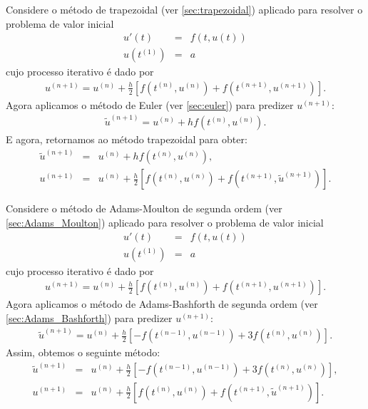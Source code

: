 \begin{ex} Considere o método de trapezoidal (ver \ref{sec:trapezoidal}) aplicado para resolver o problema de valor inicial
\begin{eqnarray}
  u'(t)  &=& f(t,u(t)) \\
  u(t^{(1)}) &=& a
\end{eqnarray}
cujo processo iterativo é dado por
\begin{eqnarray}
u^{(n+1)}=u^{(n)} + \frac{h}{2} \left[f(t^{(n)},u^{(n)})+f(t^{(n+1)},u^{(n+1)})\right].
\end{eqnarray}
Agora aplicamos o método de Euler (ver \ref{sec:euler}) para predizer $u^{(n+1)}$:
\begin{eqnarray}
\tilde{u}^{(n+1)}=u^{(n)} + h f(t^{(n)},u^{(n)}).
\end{eqnarray}
E agora, retornamos ao método trapezoidal para obter:
\begin{eqnarray}
\tilde{u}^{(n+1)}&=&u^{(n)} + h f(t^{(n)},u^{(n)}),\\
u^{(n+1)}&=&u^{(n)} + \frac{h}{2} \left[f(t^{(n)},u^{(n)})+f(t^{(n+1)},\tilde{u}^{(n+1)})\right].
\end{eqnarray}
\end{ex}

\begin{ex} Considere o método de Adams-Moulton de segunda ordem (ver \ref{sec:Adams_Moulton}) aplicado para resolver  o problema de valor inicial
\begin{eqnarray}
  u'(t)  &=& f(t,u(t)) \\
  u(t^{(1)}) &=& a
\end{eqnarray}
cujo processo iterativo é dado por
\begin{eqnarray}
u^{(n+1)}=u^{(n)} + \frac{h}{2} \left[f(t^{(n)},u^{(n)})+f(t^{(n+1)},u^{(n+1)})\right].
\end{eqnarray}
Agora aplicamos o método de Adams-Bashforth de segunda ordem (ver \ref{sec:Adams_Bashforth}) para predizer $u^{(n+1)}$:
\begin{eqnarray}
\tilde{u}^{(n+1)}=u^{(n)} + \frac{h}{2} \left[-f(t^{(n-1)},u^{(n-1)})+3f(t^{(n)},u^{(n)})\right].
\end{eqnarray}
Assim, obtemos o seguinte método:
\begin{eqnarray}
\tilde{u}^{(n+1)}&=&u^{(n)} + \frac{h}{2} \left[-f(t^{(n-1)},u^{(n-1)})+3f(t^{(n)},u^{(n)})\right],\\
u^{(n+1)}&=&u^{(n)} + \frac{h}{2} \left[f(t^{(n)},u^{(n)})+f(t^{(n+1)},\tilde{u}^{(n+1)})\right].
\end{eqnarray}
\end{ex}

